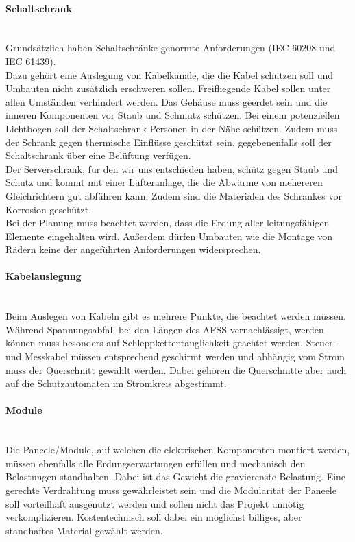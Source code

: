     \paragraph{Schaltschrank}\mbox{}\\
    Grundsätzlich haben Schaltschränke genormte Anforderungen (IEC 60208 und IEC 61439).\\
    Dazu gehört eine Auslegung von Kabelkanäle, die die Kabel schützen soll und Umbauten nicht zusätzlich erschweren sollen. Freifliegende Kabel sollen unter allen Umständen verhindert werden. Das Gehäuse muss geerdet sein und die inneren Komponenten vor Staub und Schmutz schützen. Bei einem potenziellen Lichtbogen soll der Schaltschrank Personen in der Nähe schützen. Zudem muss der Schrank gegen thermische Einflüsse geschützt sein, gegebenenfalls soll der Schaltschrank über eine Belüftung verfügen.\\
    Der Serverschrank, für den wir uns entschieden haben, schütz gegen Staub und Schutz und kommt mit einer Lüfteranlage, die die Abwärme von mehereren Gleichrichtern gut abführen kann. Zudem sind die Materialen des Schrankes vor Korrosion geschützt. \cite{Schaltschrank-Anforderungen} \\
    Bei der Planung muss beachtet werden, dass die Erdung aller leitungsfähigen Elemente eingehalten wird. Außerdem dürfen Umbauten wie die Montage von Rädern keine der angeführten Anforderungen widersprechen.

    \paragraph{Kabelauslegung}\mbox{}\\
    Beim Auslegen von Kabeln gibt es mehrere Punkte, die beachtet werden müssen. Während Spannungsabfall bei den Längen des AFSS vernachlässigt, werden können muss besonders auf Schleppkettentauglichkeit geachtet werden. Steuer- und Messkabel müssen entsprechend geschirmt werden und abhängig vom Strom muss der Querschnitt gewählt werden. Dabei gehören die Querschnitte aber auch auf die Schutzautomaten im Stromkreis abgestimmt.\\

    \paragraph{Module}\mbox{}\\
    Die Paneele/Module, auf welchen die elektrischen Komponenten montiert werden, müssen ebenfalls alle Erdungserwartungen erfüllen und mechanisch den Belastungen standhalten. Dabei ist das Gewicht die gravierenste Belastung. Eine gerechte Verdrahtung muss gewährleistet sein und die Modularität der Paneele soll vorteilhaft ausgenutzt werden und sollen nicht das Projekt unnötig verkomplizieren. Kostentechnisch soll dabei ein möglichst billiges, aber standhaftes Material gewählt werden.

